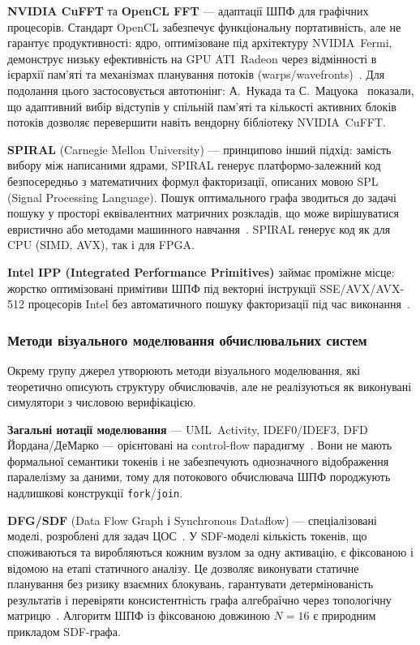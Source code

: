 \textbf{NVIDIA CuFFT} та \textbf{OpenCL FFT} --- адаптації ШПФ
для графічних процесорів. Стандарт OpenCL забезпечує функціональну
портативність, але не гарантує продуктивності: ядро, оптимізоване
під архітектуру NVIDIA~Fermi, демонструє низьку ефективність на
GPU ATI~Radeon через відмінності в ієрархії пам'яті та механізмах
планування потоків (warps/wavefronts)~\cite{du2012}. Для подолання
цього застосовується автотюнінг: А.~Нукада та С.~Мацуока~\cite{nukada2009}
показали, що адаптивний вибір відступів у спільній пам'яті та
кількості активних блоків потоків дозволяє перевершити навіть
вендорну бібліотеку NVIDIA~CuFFT.

\textbf{SPIRAL} (Carnegie Mellon University) --- принципово інший
підхід: замість вибору між написаними ядрами, SPIRAL генерує
платформо-залежний код безпосередньо з математичних формул
факторизації, описаних мовою SPL (Signal Processing Language).
Пошук оптимального графа зводиться до задачі пошуку у просторі
еквівалентних матричних розкладів, що може вирішуватися евристично
або методами машинного навчання~\cite{puschel2004}. SPIRAL
генерує код як для CPU (SIMD, AVX), так і для FPGA.

\textbf{Intel IPP (Integrated Performance Primitives)} займає
проміжне місце: жорстко оптимізовані примітиви ШПФ під векторні
інструкції SSE/AVX/AVX-512 процесорів Intel без автоматичного
пошуку факторизації під час виконання~\cite{intel_ipp}.

\subsubsection*{Методи візуального моделювання обчислювальних систем}

Окрему групу джерел утворюють методи візуального моделювання,
які теоретично описують структуру обчислювачів, але не реалізуються
як виконувані симулятори з числовою верифікацією.

\textbf{Загальні нотації моделювання} --- UML~Activity,
IDEF0/IDEF3, DFD Йордана/ДеМарко --- орієнтовані на control-flow
парадигму~\cite{rumbaugh2004,yourdon1979}. Вони не мають формальної
семантики токенів і не забезпечують однозначного відображення
паралелізму за даними, тому для потокового обчислювача ШПФ
породжують надлишкові конструкції \texttt{fork}/\texttt{join}.

\textbf{DFG/SDF} (Data Flow Graph і Synchronous Dataflow) ---
спеціалізовані моделі, розроблені для задач ЦОС~\cite{veen1986,lee1994,mit_dataflow}.
У SDF-моделі кількість токенів, що споживаються та виробляються
кожним вузлом за одну активацію, є фіксованою і відомою на етапі
статичного аналізу. Це дозволяє виконувати статичне планування без
ризику взаємних блокувань, гарантувати детермінованість результатів
і перевіряти консистентність графа алгебраїчно через топологічну
матрицю~\cite{schaumont2019}. Алгоритм ШПФ із фіксованою довжиною
$N = 16$ є природним прикладом SDF-графа.

